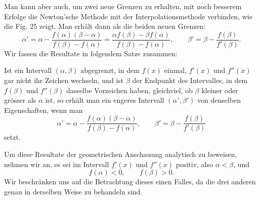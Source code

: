 \documentclass[11pt]{article}
\begin{document}
\weberfigtwentyfive

Man kann aber auch, um zwei neue Grenzen zu erhalten, mit noch besserem Erfolge die Newton'sche Methode mit der Interpolationsmethode verbinden, wie die Fig. 25 zeigt. Man erhält dann als die beiden neuen Grenzen:
\[
        \alpha'=\alpha-\frac{f(\alpha)(\beta-\alpha)}{f(\beta)-f(\alpha)}
        =\frac{\alpha f(\beta)-\beta f(\alpha)}{f(\beta)-f(\alpha)},
        \qquad
        \beta'=\beta-\frac{f(\beta)}{f'(\beta)}.
\]
Wir fassen die Resultate in folgendem Satze zusammen:

Ist ein Intervall $(\alpha,\beta)$ abgegrenzt, in dem $f(x)$ einmal, $f'(x)$ und $f''(x)$ gar nicht ihr Zeichen wechseln, und ist $\beta$ der Endpunkt des Intervalles, in dem $f(\beta)$ und $f''(\beta)$ dasselbe Vorzeichen haben, gleichviel, ob $\beta$ kleiner oder grösser als $\alpha$ ist, so erhält man ein engeres Intervall $(\alpha',\beta')$ von denselben Eigenschaften, wenn man
\begin{equation}
        \alpha'=\alpha-\frac{f(\alpha)(\beta-\alpha)}{f(\beta)-f(\alpha)},
        \qquad
        \beta'=\beta-\frac{f(\beta)}{f'(\beta)}
\tag{4}
\end{equation}
setzt.

Um diese Resultate der geometrischen Anschauung analytisch zu beweisen, nehmen wir an, es sei im Intervall $f'(x)$ und $f''(x)$ positiv, also $\alpha<\beta$, und
\[
        f(\alpha)<0,\qquad f(\beta)>0.
\]
Wir beschränken uns auf die Betrachtung dieses einen Falles, da die drei anderen genau in derselben Weise zu behandeln sind.
\end{document}
